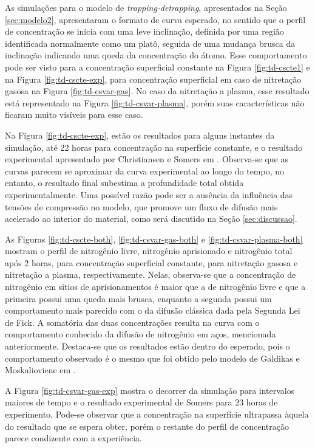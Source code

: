 As simulações para o modelo de \textit{trapping-detrapping}, apresentados na Seção \ref{sec:modelo2}, apresentaram o formato de curva esperado, no sentido que o perfil de concentração se inicia com uma leve inclinação, definida por uma região identificada normalmente como um platô, seguida de uma mudança brusca da inclinação indicando uma queda da concentração do átomo. Esse comportamento pode ser visto para a concentração superficial constante na Figura \ref{fig:td-cscte1} e na Figura \ref{fig:td-cscte-exp}, para concentração superficial em caso de nitretação gasosa na Figura \ref{fig:td-csvar-gas}. No caso da nitretação a plasma, esse resultado está representado na Figura \ref{fig:td-csvar-plasma}, porém suas características não ficaram muito visíveis para esse caso.

Na Figura \ref{fig:td-cscte-exp}, estão os resultados para alguns instantes da simulação, até 22 horas para concentração na superfície constante, e o resultado experimental apresentado por Christiansen e Somers em \cite{christiansen2008nitrogen}. Observa-se que as curvas parecem se aproximar da curva experimental ao longo do tempo, no entanto, o resultado final subestima a profundidade total obtida experimentalmente. Uma possível razão pode ser a ausência da influência das tensões de compressão no modelo, que promove um fluxo de difusão mais acelerado ao interior do material, como será discutido na Seção \ref{sec:discussao}.



As Figuras \ref{fig:td-cscte-both}, \ref{fig:td-csvar-gas-both} e \ref{fig:td-csvar-plasma-both} mostram o perfil de nitrogênio livre, nitrogênio aprisionado e nitrogênio total após 2 horas, para concentração superficial constante, para nitretação gasosa e nitretação a plasma, respectivamente. Nelas, observa-se que a concentração de nitrogênio em sítios de aprisionamentos é maior que a de nitrogênio livre e que a primeira possui uma queda mais brusca, enquanto a segunda possui um comportamento mais parecido com o da difusão clássica dada pela Segunda Lei de Fick. A somatória das duas concentrações resulta na curva com o comportamento conhecido da difusão de nitrogênio em aços, mencionada anteriormente. Destaca-se que os resultados estão dentro do esperado, pois o comportamento observado é o mesmo que foi obtido pelo modelo de Galdikas e Moskalioviene em \cite{moskalioviene2011modeling}. 

A Figura \ref{fig:td-csvar-gas-exp} mostra o decorrer da simulação para intervalos maiores de tempo e o resultado experimental de Somers para 23 horas de experimento. Pode-se observar que a concentração na superfície ultrapassa àquela do resultado que se espera obter, porém o restante do perfil de concentração parece condizente com a experiência.

